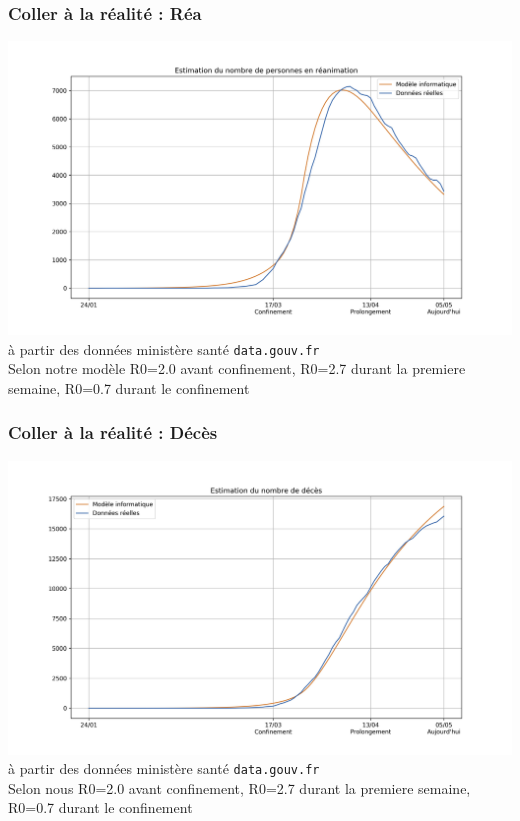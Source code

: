 \documentclass[a4paper]{cours-bdd}
\begin{document}

\begin{frame}[fragile]
\frametitle{Coller à la réalité : Réa}

  \begin{center}
    \includegraphics[width=1.0\linewidth]{figure1.jpg} \\
    {\tiny à partir des données ministère santé \texttt{data.gouv.fr} \\
      {\tiny Selon notre modèle R0=2.0 avant confinement, R0=2.7 durant la premiere semaine, R0=0.7 durant le confinement}}

  \end{center}
  
\end{frame}



\begin{frame}[fragile]
\frametitle{Coller à la réalité : Décès}

  \begin{center}
    \includegraphics[width=1.0\linewidth]{figure2.jpg} \\
    {\tiny à partir des données ministère santé \texttt{data.gouv.fr}} \\
    {\tiny Selon nous R0=2.0 avant confinement, R0=2.7 durant la premiere semaine, R0=0.7 durant le confinement}

\end{center}
  
\end{frame}
\end{document}
